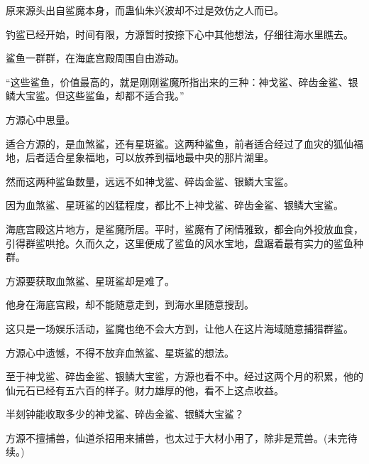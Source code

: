 \begin{this_body}
原来源头出自鲨魔本身，而蛊仙朱兴波却不过是效仿之人而已。

钓鲨已经开始，时间有限，方源暂时按捺下心中其他想法，仔细往海水里瞧去。

鲨鱼一群群，在海底宫殿周围自由游动。

“这些鲨鱼，价值最高的，就是刚刚鲨魔所指出来的三种：神戈鲨、碎齿金鲨、银鳞大宝鲨。但这些鲨鱼，却都不适合我。”

方源心中思量。

适合方源的，是血煞鲨，还有星斑鲨。这两种鲨鱼，前者适合经过了血灾的狐仙福地，后者适合星象福地，可以放养到福地最中央的那片湖里。

然而这两种鲨鱼数量，远远不如神戈鲨、碎齿金鲨、银鳞大宝鲨。

因为血煞鲨、星斑鲨的凶猛程度，都比不上神戈鲨、碎齿金鲨、银鳞大宝鲨。

海底宫殿这片地方，是鲨魔所居。平时，鲨魔有了闲情雅致，都会向外投放血食，引得群鲨哄抢。久而久之，这里便成了鲨鱼的风水宝地，盘踞着最有实力的鲨鱼种群。

方源要获取血煞鲨、星斑鲨却是难了。

他身在海底宫殿，却不能随意走到，到海水里随意搜刮。

这只是一场娱乐活动，鲨魔也绝不会大方到，让他人在这片海域随意捕猎群鲨。

方源心中遗憾，不得不放弃血煞鲨、星斑鲨的想法。

至于神戈鲨、碎齿金鲨、银鳞大宝鲨，方源也看不中。经过这两个月的积累，他的仙元石已经有五六百的样子。财力雄厚的他，看不上这点收益。

半刻钟能收取多少的神戈鲨、碎齿金鲨、银鳞大宝鲨？

方源不擅捕兽，仙道杀招用来捕兽，也太过于大材小用了，除非是荒兽。(未完待续。)

\end{this_body}

